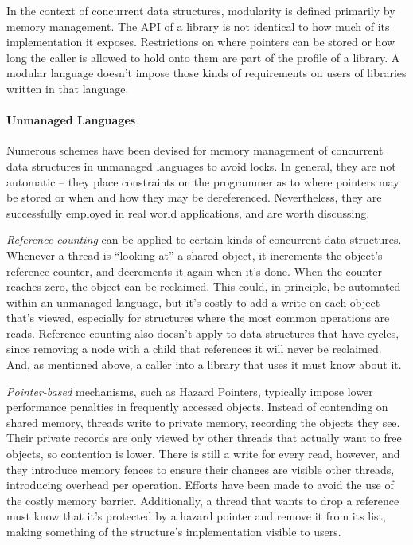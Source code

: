 In the context of concurrent data structures, modularity is defined primarily by memory management.  The API of a library is not identical to how much of its implementation it exposes.  Restrictions on where pointers can be stored or how long the caller is allowed to hold onto them are part of the profile of a library.  A modular language doesn't impose those kinds of requirements on users of libraries written in that language.

\paragraph{Unmanaged Languages} Numerous schemes have been devised for memory management of concurrent data structures in unmanaged languages to avoid locks.  In general, they are not automatic -- they place constraints on the programmer as to where pointers may be stored or when and how they may be dereferenced.  Nevertheless, they are successfully employed in real world applications, and are worth discussing.

\textit{Reference counting} can be applied to certain kinds of concurrent data structures\cite{DMMS, GPST09}.  Whenever a thread is ``looking at'' a shared object, it increments the object's reference counter, and decrements it again when it's done.  When the counter reaches zero, the object can be reclaimed.  This could, in principle, be automated within an unmanaged language, but it's costly to add a write on each object that's viewed, especially for structures where the most common operations are reads.  Reference counting also doesn't apply to data structures that have cycles, since removing a node with a child that references it will never be reclaimed.  And, as mentioned above, a caller into a library that uses it must know about it.

\textit{Pointer-based} mechanisms, such as Hazard Pointers\cite{HP, DTA, PassTheBuck}, typically impose lower performance penalties in frequently accessed objects.  Instead of contending on shared memory, threads write to private memory, recording the objects they see.  Their private records are only viewed by other threads that actually want to free objects, so contention is lower.  There is still a write for every read, however, and they introduce memory fences to ensure their changes are visible other threads, introducing overhead per operation.  Efforts have been made to avoid the use of the costly memory barrier.\cite{MauriceCadence}  Additionally, a thread that wants to drop a reference must know that it's protected by a hazard pointer and remove it from its list, making something of the structure's implementation visible to users.

